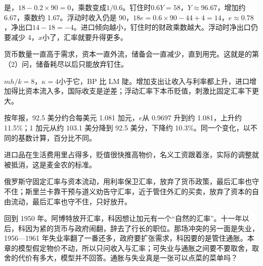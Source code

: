 \begin{answers}
\item 是，$18-0.2\times90=0$，乘数变成$1/0.6$。钉住时$0.6Y=58$，$Y\approx96.67$，增加约 6.67，乘数约 1.67。浮动时收入仍是 90，$18e=0.6\times90-44+4=14$，$e\approx0.78$，净出口$14-18=-4$。进口倾向越小，钉住时的财政乘数越大。浮动时净出口仍要减少 4，$x$小了，汇率就要升得更多。
\item 货币数量一直高于需求，资本一直外流，储备会一直减少，直到用完。这就是的第（2）问，储备耗尽以后只能放弃钉住。
\item $mh/k=8$，$\kappa=4$小于它，BP 比 LM 陡。增加支出让收入与利率都上升，进口增加得比资本流入多，国际收支是逆差；浮动汇率下本币贬值，刺激比固定汇率下更大。
\item 按年报，92.5 美分约合每美元 1.081 加元，$e$从 0.9697 升到约 1.081，上升约 11.5\%；1 加元从约 103.1 美分降到 92.5 美分，下降约 10.3\%。同一个变化，以不同的基数计算，百分比不同。
\item 进口品在生活费用里占得多，贬值很快推高物价，名义工资跟着涨，实际的调整就被抵消，这是麦金农的标准。
\item 俄罗斯守固定汇率与资本流动，用利率保卫汇率，放弃了货币政策，最后汇率也守不住；斯里兰卡靠干预与道义劝告守汇率，近于管住外汇的买卖，放弃了资本的自由流动，最后汇率也守不住，只好放开。
\end{answers}

回到 1950 年。阿博特放开汇率，科因想让加元有一个“自然的汇率”\cite{powell2005}。十一年以后，科因为紧的货币与政府闹翻，辞去了行长的职位。那场冲突的另一面是失业，1956—1961 年失业率翻了一番还多，政府要扩张需求，科因要的是管住通胀\cite{powell2005}。本章的模型假定物价不动，所以只问收入与汇率；可失业与通胀之间要不要取舍，取舍的代价有多大，模型并不回答。通胀与失业真是一张可以点菜的菜单吗？
